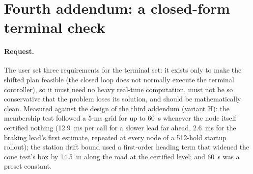 \documentclass[11pt]{article}
\begin{document}
\section{Fourth addendum: a closed-form terminal check}
\paragraph{Request.} The user set three requirements for the terminal set: it
exists only to make the shifted plan feasible (the closed loop does not
normally execute the terminal controller), so it must need no heavy real-time
computation, must not be so conservative that the problem loses its solution,
and should be mathematically clean. Measured against the design of the third
addendum (variant H): the membership test followed a 5-ms grid for up to 60~s
whenever the node itself certified nothing (12.9~ms per call for a slower
lead far ahead, 2.6~ms for the braking lead's first estimate, repeated at
every node of a 512-hold startup rollout); the station drift bound used a
first-order heading term that widened the cone test's box by 14.5~m along the
road at the certified level; and 60~s was a preset constant.
\end{document}
